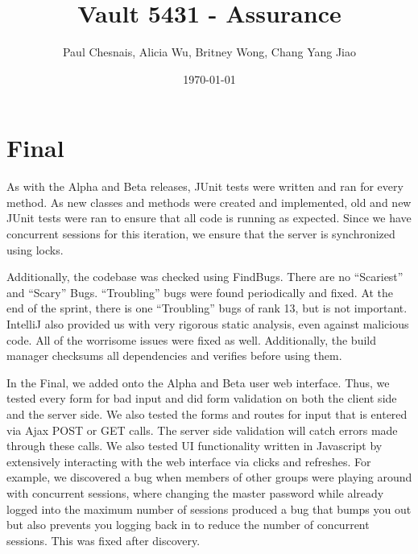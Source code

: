 \documentclass{article}
\title{Vault 5431 - Assurance}
\author{Paul Chesnais, Alicia Wu, Britney Wong, Chang Yang Jiao}
\date{\today}
\begin{document}
\maketitle
\thispagestyle{empty}
\section{Final}
\par As with the Alpha and Beta releases, JUnit tests were written and ran for every method. As new classes and methods were created and implemented, old and new JUnit tests were ran to ensure that all code is running as expected. Since we have concurrent sessions for this iteration, we ensure that the server is synchronized using locks.

\par Additionally, the codebase was checked using FindBugs. There are no ``Scariest'' and ``Scary'' Bugs. ``Troubling'' bugs were found periodically and fixed. At the end of the sprint, there is one ``Troubling'' bugs of rank 13, but is not important. IntelliJ also provided us with very rigorous static analysis, even against malicious code. All of the worrisome issues were fixed as well. Additionally, the build manager checksums all dependencies and verifies before using them.

\par In the Final, we added onto the Alpha and Beta user web interface. Thus, we tested every form for bad input and did form validation on both the client side and the server side. We also tested the forms and routes for input that is entered via Ajax POST or GET calls. The server side validation will catch errors made through these calls. We also tested UI functionality written in Javascript by extensively interacting with the web interface via clicks and refreshes. For example, we discovered a bug when members of other groups were playing around with concurrent sessions, where changing the master password while already logged into the maximum number of sessions produced a bug that bumps you out but also prevents you logging back in to reduce the number of concurrent sessions. This was fixed after discovery.
\end{document}
